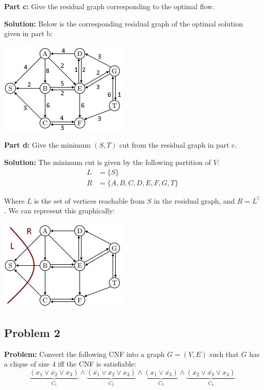 \documentclass{article}
\begin{document}
\noindent\textbf{Part c:} Give the residual graph corresponding to the optimal flow.
\bigskip

\noindent\textbf{Solution:} Below is the corresponding residual graph of the optimal solution given in part b:
\begin{center}
  \includegraphics{graphResidual.png}
\end{center}
\bigskip

\noindent\textbf{Part d:} Give the minimum $(S,T)$ cut from the residual graph in part c.
\bigskip

\noindent\textbf{Solution:} The minimum cut is given by the following partition of $V$:
\begin{align*}
  L&=\{S\}\\
  R&=\{A,B,C,D,E,F,G,T\}
\end{align*}

Where $L$ is the set of vertices reachable from $S$ in the residual graph, and $R=L^\complement$. We can represent this graphically:
\begin{center}
  \includegraphics{graphCut.png}
\end{center}

\subsection*{Problem 2}
\noindent\textbf{Problem:} Convert the following CNF into a graph $G=(V,E)$ such that $G$ has a clique of size 4 iff the CNF is satisfiable:
$$\underbrace{(x_1\vee\overline{x_2}\vee x_3)}_{C_1}\wedge\underbrace{(\overline{x_1}\vee x_2\vee x_3)}_{C_2}\wedge\underbrace{(x_1\vee\overline{x_3})}_{C_3}\wedge\underbrace{(x_2\vee\overline{x_3}\vee x_4)}_{C_4}$$
\end{document}
